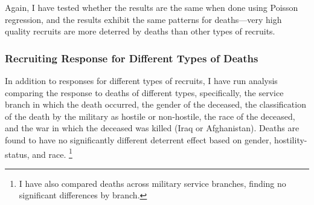 \documentclass[12pt] {article}
\begin{document}
Again, I have tested whether the results are the same when done using Poisson regression, and the results exhibit the same patterns for deaths---very high quality recruits are more deterred by deaths than other types of recruits.


\subsubsection{Recruiting Response for Different Types of Deaths\label{sub:Different Death Types}}

In addition to responses for different types of recruits, I have run analysis comparing the response to deaths of different types, specifically, the service branch in which the death occurred, the gender of the deceased, the classification of the death by the military as hostile or non-hostile, the race of
the deceased, and the war in which the deceased was killed (Iraq or
Afghanistan). Deaths are found to have no significantly different
deterrent effect based on gender, hostility-status, and race.%
\footnote{%
I have also compared deaths across military service branches, finding no significant differences by branch.} 
\end{document}

